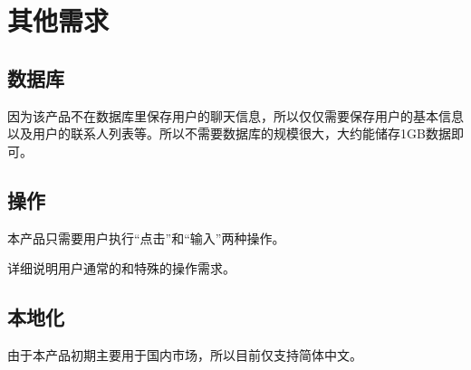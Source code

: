 \chapter{其他需求}
\iffalse
<Any other requirement specified by the customer need to be listed below with appropriate section. This may include Database, Coding requirements, Error handling, Testing requirements etc., Few sample requirements are listed below. Please note, you may remove or add if something is not applicable. >

使用适当的章节，详细说明任何其他客户需求，包括数据库，编码需求，错误处理，测试需求等。下面仅列出了少量样例，你可以删除和增加项目。
\fi
\section{数据库}
因为该产品不在数据库里保存用户的聊天信息，所以仅仅需要保存用户的基本信息以及用户的联系人列表等。所以不需要数据库的规模很大，大约能储存1GB数据即可。
\section{操作}
本产品只需要用户执行“点击”和“输入”两种操作。

详细说明用户通常的和特殊的操作需求。
\section{本地化}
由于本产品初期主要用于国内市场，所以目前仅支持简体中文。
